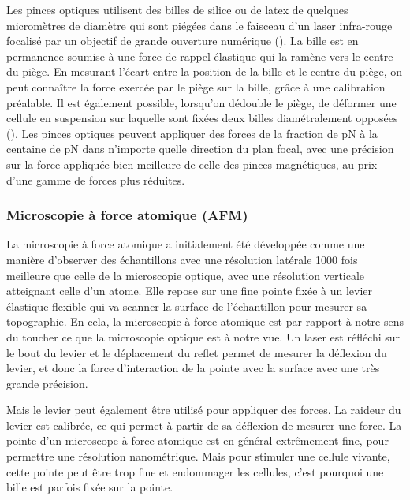 Les pinces optiques utilisent des billes de silice ou de latex de quelques micromètres de diamètre qui sont piégées dans le faisceau d’un laser infra-rouge focalisé par un objectif de grande ouverture numérique (\parencite{neuman_optical_2004}).
La bille est en permanence soumise à une force de rappel élastique qui la ramène vers le centre du piège. 
En mesurant l'écart entre la position de la bille et le centre du piège, on peut connaître la force exercée par le piège sur la bille, grâce à une calibration préalable. 
Il est également possible, lorsqu'on dédouble le piège, de déformer une cellule en suspension sur laquelle sont fixées deux billes diamétralement opposées (\cite{henon_new_1999}). 
Les pinces optiques peuvent appliquer des forces de la fraction de pN à la centaine de pN dans n'importe quelle direction du plan focal, avec une précision sur la force appliquée bien meilleure de celle des pinces magnétiques, au prix d'une gamme de forces plus réduites. 

\subsubsection{Microscopie à force atomique (AFM)}

La microscopie à force atomique a initialement été développée comme une manière d'observer des échantillons avec une résolution latérale 1000 fois meilleure que celle de la microscopie optique, avec une résolution verticale atteignant celle d'un atome. 
Elle repose sur une fine pointe fixée à un levier élastique flexible qui va scanner la surface de l'échantillon pour mesurer sa topographie. En cela, la microscopie à force atomique est par rapport à notre sens du toucher ce que la microscopie optique est à notre vue. Un laser est réfléchi sur le bout du levier et le déplacement du reflet permet de mesurer la déflexion du levier, et donc la force d'interaction de la pointe avec la surface avec une très grande précision. 

Mais le levier peut également être utilisé pour appliquer des forces. La raideur du levier est calibrée, ce qui permet à partir de sa déflexion de mesurer une force. 
La pointe d'un microscope à force atomique est en général extrêmement fine, pour permettre une résolution nanométrique. Mais pour stimuler une cellule vivante, cette pointe peut être trop fine et endommager les cellules, c'est pourquoi une bille est parfois fixée sur la pointe.

